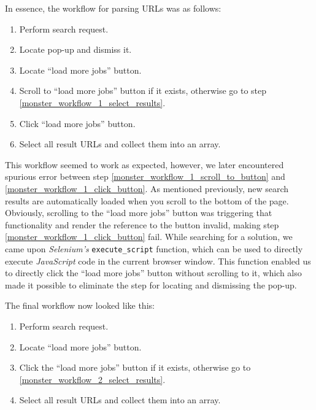 \documentclass[runningheads]{llncs}
\begin{document}
In essence, the workflow for parsing URLs was as follows:

\begin{enumerate}
  \item Perform search request.
  \item Locate pop-up and dismiss it.
  \item Locate “load more jobs” button.
  \item \label{monster_workflow_1_scroll_to_button}
    Scroll to “load more jobs” button if it exists, otherwise go to step \ref{monster_workflow_1_select_results}.
  \item \label{monster_workflow_1_click_button}
    Click “load more jobs” button.
  \item \label{monster_workflow_1_select_results}
    Select all result URLs and collect them into an array.
\end{enumerate}

This workflow seemed to work as expected, however, we later encountered spurious error between step \ref{monster_workflow_1_scroll_to_button} and \ref{monster_workflow_1_click_button}. As mentioned previously, new search results are automatically loaded when you scroll to the bottom of the page. Obviously, scrolling to the “load more jobs” button was triggering that functionality and render the reference to the button invalid, making step \ref{monster_workflow_1_click_button} fail. While searching for a solution, we came upon \textit{Selenium's} \texttt{execute\_script} function, which can be used to directly execute \textit{JavaScript} code in the current browser window. This function enabled us to directly click the “load more jobs” button without scrolling to it, which also made it possible to eliminate the step for locating and dismissing the pop-up.

The final workflow now looked like this:

\begin{enumerate}
  \item Perform search request.
  \item Locate “load more jobs” button.
  \item Click the “load more jobs” button if it exists, otherwise go to \ref{monster_workflow_2_select_results}.
  \item \label{monster_workflow_2_select_results}
    Select all result URLs and collect them into an array.
\end{enumerate}
\end{document}
